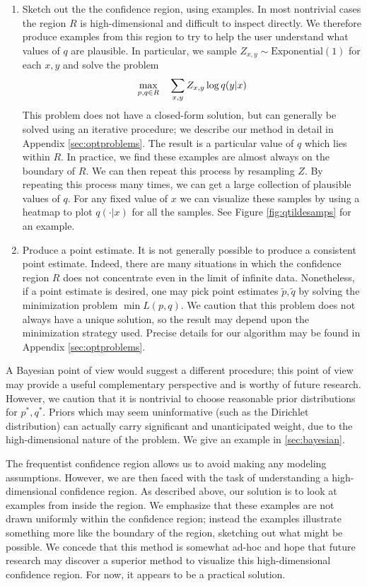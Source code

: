 \begin{enumerate}
    \item Sketch out the the confidence region, using examples.  In most nontrivial cases the region $R$ is high-dimensional and difficult to inspect directly.  We therefore produce examples from this region to try to help the user understand what values of $q$ are plausible.  In particular, we sample $Z_{x,y} \sim \mathrm{Exponential}(1)$ for each $x,y$ and solve the problem
    \[
    \max_{p,q \in R} \quad \sum_{x,y} Z_{x,y} \log q(y|x) \\
    \]
    This problem does not have a closed-form solution, but can generally be solved using an iterative procedure; we describe our method in detail in Appendix \ref{sec:optproblems}.  The result is a particular value of $q$ which lies within $R$.  In practice, we find these examples are almost always on the boundary of $R$.  We can then repeat this process by resampling $Z$.  By repeating this process many times, we can get a large collection of plausible values of $q$.  For any fixed value of $x$ we can visualize these samples by using a heatmap to plot $q(\cdot |x)$ for all the samples.  See Figure \ref{fig:qtildesamps} for an example.
    
    \item Produce a point estimate.  It is not generally possible to produce a consistent point estimate.  Indeed, there are many situations in which the confidence region $R$ does not concentrate even in the limit of infinite data.  Nonetheless, if a point estimate is desired, one may pick point estimates $\tilde p,\tilde q$ by solving the minimization problem $\min L(p,q)$.  We caution that this problem does not always have a unique solution, so the result may depend upon the minimization strategy used.  Precise details for our algorithm may be found in Appendix \ref{sec:optproblems}.
\end{enumerate}

A Bayesian point of view would suggest a different procedure; this point of view may provide a useful complementary perspective and is worthy of future research.  However, we caution that it is nontrivial to choose reasonable prior distributions for $p^*,q^*$.  Priors which may seem uninformative (such as the Dirichlet distribution) can actually carry significant and unanticipated weight, due to the high-dimensional nature of the problem.  We give an example in \ref{sec:bayesian}.  

The frequentist confidence region allows us to avoid making any modeling assumptions.  However, we are then faced with the task of understanding a high-dimensional confidence region.  As described above, our solution is to look at examples from inside the region.  We emphasize that these examples are not drawn uniformly within the confidence region; instead the examples illustrate something more like the boundary of the region, sketching out what might be possible.  We concede that this method is somewhat ad-hoc and hope that future research may discover a superior method to visualize this high-dimensional confidence region.  For now, it appears to be a practical solution.


